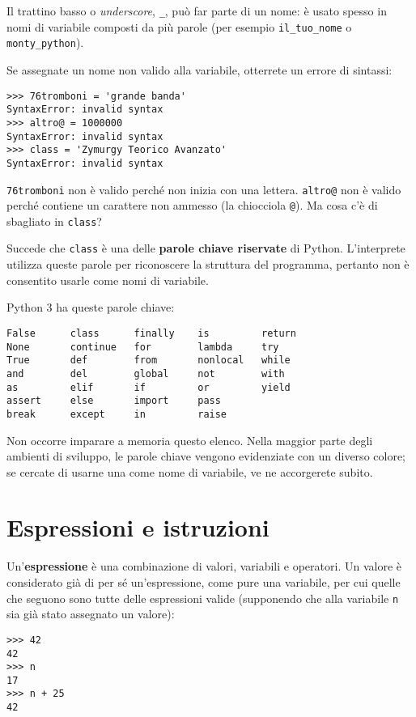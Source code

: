 \documentclass[10pt]{book}
\begin{document}
Il trattino basso o {\em underscore}, \verb"_", può far parte di un nome: è usato spesso in nomi di variabile composti da più parole (per esempio 
\verb"il_tuo_nome" o \verb"monty_python").

Se assegnate un nome non valido alla variabile, otterrete un errore di sintassi:

\begin{verbatim}
>>> 76tromboni = 'grande banda'
SyntaxError: invalid syntax
>>> altro@ = 1000000
SyntaxError: invalid syntax
>>> class = 'Zymurgy Teorico Avanzato'
SyntaxError: invalid syntax
\end{verbatim}
%
{\tt 76tromboni} non è valido perché non inizia con una lettera.
{\tt altro@} non è valido perché contiene un carattere non ammesso (la chiocciola {\tt @}). Ma cosa c'è di sbagliato in {\tt class}?

Succede che {\tt class} è una delle {\bf parole chiave riservate} di Python. L'interprete utilizza queste parole per riconoscere la struttura del programma, pertanto non è consentito usarle come nomi di variabile.

Python 3 ha queste parole chiave:

\begin{verbatim}
False      class      finally    is         return
None       continue   for        lambda     try
True       def        from       nonlocal   while
and        del        global     not        with
as         elif       if         or         yield
assert     else       import     pass
break      except     in         raise
\end{verbatim}
%
Non occorre imparare a memoria questo elenco. Nella maggior parte degli ambienti di sviluppo, le parole chiave vengono evidenziate con un diverso colore; se cercate di usarne una come nome di variabile, ve ne accorgerete subito.


\section{Espressioni e istruzioni}

Un'{\bf espressione} è una combinazione di valori, variabili e operatori. Un valore è considerato già di per sé un'espressione, come pure una variabile, per cui quelle che seguono sono tutte delle espressioni valide (supponendo che alla variabile {\tt n} sia già stato assegnato un valore):

\begin{verbatim}
>>> 42
42
>>> n
17
>>> n + 25
42
\end{verbatim}
%
\end{document}
